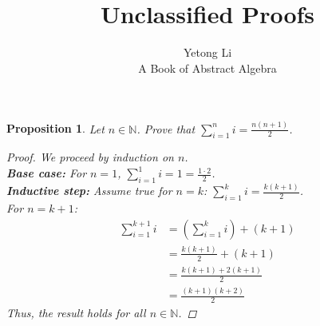 \documentclass[12pt]{article}
\newtheorem{proposition}{Proposition}
\begin{document}

\title{Unclassified Proofs}
\author{Yetong Li \\ A Book of Abstract Algebra}

\maketitle


\begin{proposition}
  Let $n \in \mathbb{N}$. Prove that $\sum_{i=1}^n i = \frac{n(n+1)}{2}$.
  \begin{proof}
    We proceed by induction on $n$. \\
    \textbf{Base case:} For $n=1$, $\sum_{i=1}^1 i = 1 = \frac{1 \cdot 2}{2}$. \\
    \textbf{Inductive step:} Assume true for $n=k$: $\sum_{i=1}^k i = \frac{k(k+1)}{2}$. \\
    For $n=k+1$:
    \begin{align*}
      \sum_{i=1}^{k+1} i & = \left(\sum_{i=1}^k i\right) + (k+1) \\
                         & = \frac{k(k+1)}{2} + (k+1)            \\
                         & = \frac{k(k+1) + 2(k+1)}{2}           \\
                         & = \frac{(k+1)(k+2)}{2}
    \end{align*}
    Thus, the result holds for all $n \in \mathbb{N}$.
  \end{proof}
\end{proposition}


\end{document}
